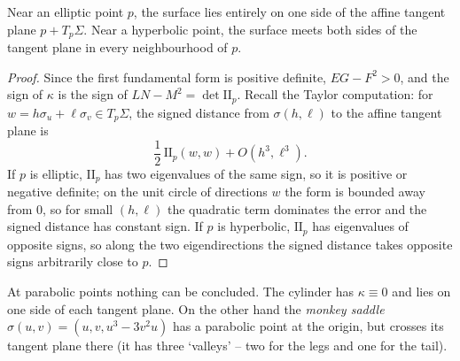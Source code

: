 \begin{lemma}
    Near an elliptic point $p$, the surface lies entirely on one side of the affine tangent plane $p + T_p\Sigma$. Near a hyperbolic point, the surface meets both sides of the tangent plane in every neighbourhood of $p$.
\end{lemma}
\begin{proof}
    Since the first fundamental form is positive definite, $EG - F^2 > 0$, and the sign of $\kappa$ is the sign of $LN - M^2 = \det \mathrm{II}_p$. Recall the Taylor computation: for $w = h\sigma_u + \ell \sigma_v \in T_p\Sigma$, the signed distance from $\sigma(h, \ell)$ to the affine tangent plane is
    $$
    \frac{1}{2}\, \mathrm{II}_p(w, w) + O(h^3, \ell^3).
    $$
    If $p$ is elliptic, $\mathrm{II}_p$ has two eigenvalues of the same sign, so it is positive or negative definite; on the unit circle of directions $w$ the form is bounded away from $0$, so for small $(h, \ell)$ the quadratic term dominates the error and the signed distance has constant sign. If $p$ is hyperbolic, $\mathrm{II}_p$ has eigenvalues of opposite signs, so along the two eigendirections the signed distance takes opposite signs arbitrarily close to $p$.
\end{proof}

\begin{remark}
    At parabolic points nothing can be concluded. The cylinder has $\kappa \equiv 0$ and lies on one side of each tangent plane. On the other hand the \emph{monkey saddle} $\sigma(u, v) = (u, v, u^3 - 3v^2u)$ has a parabolic point at the origin, but crosses its tangent plane there (it has three `valleys' -- two for the legs and one for the tail).
\end{remark}

